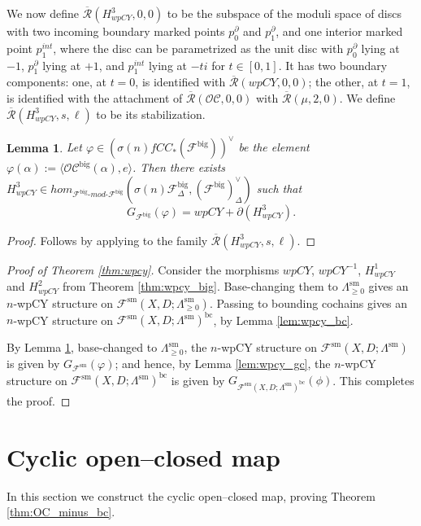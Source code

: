 \documentclass{article}
\newtheorem{lem}{Lemma}[section]
\def\fuk{\EuF}
\def\bc{\mathsf{bc}}
\def\cO{\mathcal{O}}
\def\cC{\mathcal{C}}
\def\fuk{\mathcal{F}}
\def\bc{{\operatorname{bc}}}
\newcommand{\bimod}[2]{{{#1}\text{-}mod\text{-}{#2}}}
\def\Rbar{\overline{\mathcal{R}}}
\def\big{{\operatorname{big}}}
\def\sm{{\operatorname{sm}}}
\begin{document}
We now define $\Rbar(H^3_{wpCY},0,0)$ to be the subspace of the moduli space of discs with two incoming boundary marked points $p_0^\partial$ and $p_1^\partial$, and one interior marked point $p_1^{int}$, where the disc can be parametrized as the unit disc with $p_0^\partial$ lying at $-1$, $p_1^\partial$ lying at $+1$, and $p_1^{int}$ lying at $-ti$ for $t \in [0,1]$. 
It has two boundary components: one, at $t=0$, is identified with $\Rbar(wpCY,0,0)$; the other, at $t=1$, is identified with the attachment of $\Rbar(\cO\cC,0,0)$ with $\Rbar(\mu,2,0)$. 
We define $\Rbar(H^3_{wpCY},s,\ell)$ to be its stabilization. 

\begin{lem}\label{lem:wpcy_oc}
    Let $\varphi \in (\sigma(n)fCC_*(\fuk^\big))^\vee$ be the element
    $\varphi(\alpha) := \langle \cO\cC^\big(\alpha),e\rangle$. 
    Then there exists $H^3_{wpCY} \in hom_{\bimod{\fuk^\big}{\fuk^\big}}(\sigma(n)\fuk^\big_\Delta, (\fuk^\big)^\vee_\Delta)$ such that
    $$G_{\fuk^\big}(\varphi) = wpCY + \partial(H^3_{wpCY}).$$
\end{lem}
\begin{proof}
    Follows by applying \cite[Theorem 4.18]{relfukii} to the family $\Rbar(H^3_{wpCY},s,\ell)$.
\end{proof}

\begin{proof}[Proof of Theorem \ref{thm:wpcy}]
    Consider the morphisms $wpCY$, $wpCY^{-1}$, $H^1_{wpCY}$ and $H^2_{wpCY}$ from Theorem \ref{thm:wpcy_big}. 
    Base-changing them to $\Lambda^\sm_{\ge 0}$ gives an $n$-wpCY structure on $\fuk^\sm(X,D;\Lambda^\sm_{\ge 0})$. 
    Passing to bounding cochains gives an $n$-wpCY structure on $\fuk^\sm(X,D;\Lambda^\sm)^\bc$, by Lemma \ref{lem:wpcy_bc}. 

    By Lemma \ref{lem:wpcy_oc}, base-changed to $\Lambda^\sm_{\ge 0}$, the $n$-wpCY structure on $\fuk^\sm(X,D;\Lambda^\sm)$ is given by $G_{\fuk^\sm}(\varphi)$; and hence, by Lemma \ref{lem:wpcy_gc}, the $n$-wpCY structure on $\fuk^\sm(X,D;\Lambda^\sm)^\bc$ is given by $G_{\fuk^\sm(X,D;\Lambda^\sm)^\bc}(\phi)$. 
    This completes the proof.
\end{proof}


\section{Cyclic open--closed map}\label{sec:cyc oc}

In this section we construct the cyclic open--closed map, proving Theorem \ref{thm:OC_minus_bc}.
\end{document}
